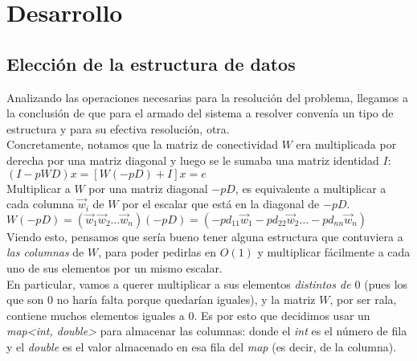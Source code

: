 \section{Desarrollo}


	\subsection{Elección de la estructura de datos}

		Analizando las operaciones necesarias para la resolución del problema, llegamos a la conclusión de que para el armado del sistema a resolver convenía un tipo de estructura y para su efectiva resolución, otra. \\

		Concretamente, notamos que la matriz de conectividad $W$ era multiplicada por derecha por una matriz diagonal y luego se le sumaba una matriz identidad $I$: \\

		$(I - pWD) x = [W (-pD) + I] x = e$ \\

		Multiplicar a $W$ por una matriz diagonal $-pD$, es equivalente a multiplicar a cada columna $\vec{w}_i$ de $W$ por el escalar que está en la diagonal de $-pD$. \\

		$ W (-pD) = \left( \vec{w}_1 \vec{w}_2 \hdots \vec{w}_n \right) (-pD) = \left( -p d_{11} \vec{w}_1  -p d_{22} \vec{w}_2  \hdots -p d_{nn} \vec{w}_n \right)$ \\

		Viendo esto, pensamos que sería bueno tener alguna estructura que contuviera a \textit{las columnas} de $W$, para poder pedirlas en $O(1)$ y multiplicar fácilmente a cada uno de sus elementos por un mismo escalar. \\

		En particular, vamos a querer multiplicar a sus elementos \textit{distintos de $0$} (pues los que son $0$ no haría falta porque quedarían iguales), y la matriz $W$, por ser rala, contiene muchos elementos iguales a $0$. Es por esto que decidimos usar un \textit{map<int, double>} para almacenar las columnas: donde el \textit{int} es el número de fila y el \textit{double} es el valor almacenado en esa fila del \textit{map} (es decir, de la columna). \\

